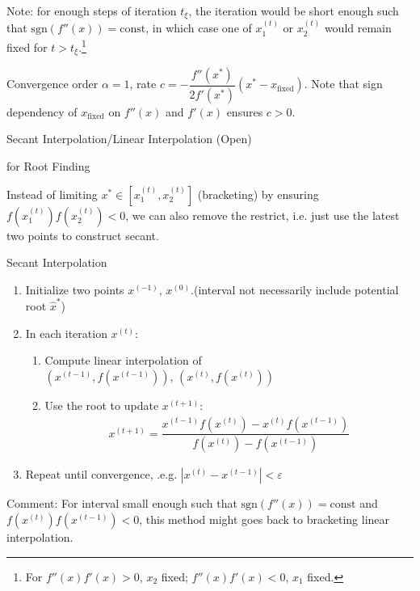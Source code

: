    Note: for enough steps of iteration $ t_\xi  $, the iteration would be short enough such that $ \mathrm{sgn}(f''(x))=\mathrm{const} $, in which case one of $ x_1^{(t)} $ or $ x_2^{(t)} $ would remain fixed for $ t>t_\xi  $.\footnote{For $ f''(x)f'(x)>0 $, $ x_2 $ fixed; $ f''(x)f'(x)<0 $, $ x_1 $ fixed.}

    Convergence order $ \alpha =1 $, rate $ c=-\dfrac{f''(x^*)}{2f'(x^*)}(x^*-x_\mathrm{fixed} ) $. Note that sign dependency of $ x_\mathrm{fixed}  $  on $ f''(x) $ and $ f'(x) $ ensures $ c>0 $.

\begin{point}
    \hypertarget{Secant}{Secant Interpolation/Linear Interpolation (Open)} for Root Finding
\end{point}    

    Instead of limiting $ x^*\in[x_1^{(t)},x_2^{(t)}] $ (bracketing) by ensuring $ f(x_1^{(t)})f(x_2^{(t)})<0 $, we can also remove the restrict, i.e. just use the latest two points to construct secant.

\begin{algorithm}{Secant Interpolation}

\begin{enumerate}[topsep=2pt,itemsep=2pt]
    \item Initialize two points  $ x^{(-1)},\,x^{(0)} $.(interval not necessarily include potential root $ \hat{x}^* $)
    \item In each iteration $ x^{(t)} $:
    \begin{enumerate}[topsep=2pt,itemsep=2pt]
        \item Compute linear interpolation of $ (x^{(t-1)},f(x^{(t-1)})),\,(x^{(t)},f(x^{(t)})) $
        \item Use the root to update $ x^{(t+1)} $:
    \begin{align}
        x^{(t+1)}=\dfrac{x^{(t-1)}f(x^{(t)})-x^{(t)}f(x^{(t-1)})}{f(x^{(t)})-f(x^{(t-1)})}
    \end{align}
    \end{enumerate}
    
    \item Repeat until convergence, .e.g. $ |x^{(t)}-x^{(t-1)}|<\varepsilon  $
\end{enumerate}

   
\end{algorithm}
    

    Comment: For interval small enough such that $ \mathrm{sgn}(f''(x))=\mathrm{const} $ and $ f(x^{(t)})f(x^{(t-1)})<0 $, this method might goes back to bracketing linear interpolation.

